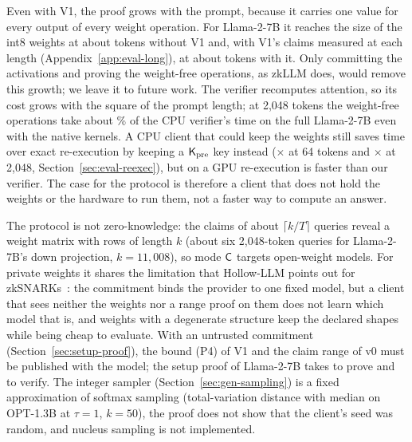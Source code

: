 Even with V1, the proof grows with the prompt, because it
carries one value for every output of every weight operation. For Llama-2-7B it reaches the size of
the int8 weights at about \BreakevenTokens{} tokens without V1 and, with V1's claims measured at each length (Appendix~\ref{app:eval-long}), at about
\BreakevenTokensVOne{} tokens with it. Only committing the activations and proving the weight-free operations, as zkLLM
does, would remove this growth; we leave it to future work. The verifier recomputes attention, so
its cost grows with the square of the prompt length; at 2{,}048 tokens the weight-free
operations take about \CpuDeriveShareLong{}\% of the CPU verifier's time on the full Llama-2-7B even with the native
kernels. A CPU client that could keep the weights still saves time over exact re-execution by
keeping a $\mathsf{K}_{\mathrm{pre}}$ key instead (\CpuRatioShort{}$\times$ at 64 tokens and \CpuRatio{}$\times$ at 2{,}048, Section~\ref{sec:eval-reexec}),
but on a GPU re-execution is faster than our verifier. The case for the protocol is
therefore a client that does not hold the weights or the hardware to run them, not a faster way to
compute an answer.

 The protocol is not zero-knowledge: the claims of about
$\lceil k/T\rceil$ queries reveal a weight matrix with rows of length $k$ (about six 2{,}048-token
queries for Llama-2-7B's down projection, $k=11{,}008$), so mode $\mathsf{C}$ targets open-weight models.
For private weights it shares the limitation that Hollow-LLM points out for
zkSNARKs~\cite{hollowllm}: the commitment binds the provider to one fixed model, but a client that
sees neither the weights nor a range proof on them does not learn which model that is, and weights
with a degenerate structure keep the declared shapes while being cheap to evaluate. With an
untrusted commitment (Section~\ref{sec:setup-proof}), the bound (P4) of V1 and the claim range of
v0 must be published with the model; the setup proof of Llama-2-7B takes \SetupProverLlama{} to prove and
\SetupVerifierLlama{} to verify. The integer sampler (Section~\ref{sec:gen-sampling}) is
a fixed approximation of softmax sampling (total-variation distance with median \TvTopK{} on OPT-1.3B at
$\tau=1$, $k=50$), the proof
does not show that the client's seed was random, and nucleus sampling is not implemented.

